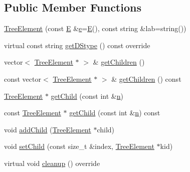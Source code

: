 \subsection*{Public Member Functions}
\begin{DoxyCompactItemize}
\item 
\mbox{\hyperlink{classbridges_1_1_tree_element_a4e96ffab9a6c711ead687dd8a42e80a0}{Tree\+Element}} (const \mbox{\hyperlink{namespacebridges_acfb0a4f7877d8f63de3e6862004c50eda3a3ea00cfc35332cedf6e5e9a32e94da}{E}} \&\mbox{\hyperlink{namespacebridges_acfb0a4f7877d8f63de3e6862004c50edae1671797c52e15f763380b45e841ec32}{e}}=\mbox{\hyperlink{namespacebridges_acfb0a4f7877d8f63de3e6862004c50eda3a3ea00cfc35332cedf6e5e9a32e94da}{E}}(), const string \&lab=string())
\item 
virtual const string \mbox{\hyperlink{classbridges_1_1_tree_element_a6b264d7391442a742edf96bdd5ee5442}{get\+D\+Stype}} () const override
\item 
vector$<$ \mbox{\hyperlink{classbridges_1_1_tree_element}{Tree\+Element}} $\ast$ $>$ \& \mbox{\hyperlink{classbridges_1_1_tree_element_a52cb83546da21674d306cbb8026f89ac}{get\+Children}} ()
\item 
const vector$<$ \mbox{\hyperlink{classbridges_1_1_tree_element}{Tree\+Element}} $\ast$ $>$ \& \mbox{\hyperlink{classbridges_1_1_tree_element_a5695c33c22a81a3225fa7b37c2bdf34f}{get\+Children}} () const
\item 
\mbox{\hyperlink{classbridges_1_1_tree_element}{Tree\+Element}} $\ast$ \mbox{\hyperlink{classbridges_1_1_tree_element_a14ce2d5b3a4df29c93a0c37dbe73f7a5}{get\+Child}} (const int \&\mbox{\hyperlink{namespacebridges_acfb0a4f7877d8f63de3e6862004c50eda7b8b965ad4bca0e41ab51de7b31363a1}{n}})
\item 
const \mbox{\hyperlink{classbridges_1_1_tree_element}{Tree\+Element}} $\ast$ \mbox{\hyperlink{classbridges_1_1_tree_element_a23321ef35ce04dd09487824af804e27b}{get\+Child}} (const int \&\mbox{\hyperlink{namespacebridges_acfb0a4f7877d8f63de3e6862004c50eda7b8b965ad4bca0e41ab51de7b31363a1}{n}}) const
\item 
void \mbox{\hyperlink{classbridges_1_1_tree_element_a5e252fa16df0e673526ba4b08c8d3203}{add\+Child}} (\mbox{\hyperlink{classbridges_1_1_tree_element}{Tree\+Element}} $\ast$child)
\item 
void \mbox{\hyperlink{classbridges_1_1_tree_element_aa12cb7cb4b4f559bdf0967872b0a6e7d}{set\+Child}} (const size\+\_\+t \&index, \mbox{\hyperlink{classbridges_1_1_tree_element}{Tree\+Element}} $\ast$kid)
\item 
virtual void \mbox{\hyperlink{classbridges_1_1_tree_element_aad832c9f8dfd7e92c7b06a825f406e1d}{cleanup}} () override
\end{DoxyCompactItemize}
